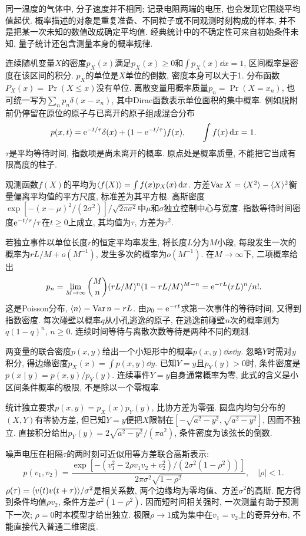 \label{ch:prob}
同一温度的气体中, 分子速度并不相同; 记录电阻两端的电压, 也会发现它围绕平均值起伏. 概率描述的对象是重复准备、不同粒子或不同观测时刻构成的样本, 并不是把某一次未知的数值改成确定平均值. 经典统计中的不确定性可来自初始条件未知, 量子统计还包含测量本身的概率规律.

连续随机变量$X$的密度$p_X(x)$满足$p_X(x)\ge0$和$\int p_X(x)\dd x=1$, 区间概率是密度在该区间的积分. $p_X$的单位是$X$单位的倒数, 密度本身可以大于1. 分布函数$P_X(x)=\Pr(X\le x)$没有单位. 离散变量用概率质量$p_n=\Pr(X=x_n)$, 也可统一写为$\sum_n p_n\delta(x-x_n)$, 其中Dirac函数表示单位面积的集中概率. 例如脱附前仍停留在原位的原子与已离开的原子组成混合分布
\[
p(x,t)=\mathrm e^{-t/\tau}\delta(x)+(1-\mathrm e^{-t/\tau})f(x),\qquad \int f(x)\,\mathrm d x=1.
\]
$\tau$是平均等待时间, 指数项是尚未离开的概率. 原点处是概率质量, 不能把它当成有限高度的柱子.

观测函数$f(X)$的平均为$\langle f(X)\rangle=\int f(x)p_X(x)\,\mathrm d x$. 方差$\operatorname{Var} X=\langle X^2\rangle-\langle X\rangle^2$衡量偏离平均值的平方尺度, 标准差为其平方根. 高斯密度$\exp[-(x-\mu)^2/(2\sigma^2)]/\sqrt{2\pi\sigma^2}$中$\mu$和$\sigma$独立控制中心与宽度. 指数等待时间密度$\mathrm e^{-t/\tau}/\tau$在$t\ge0$上成立, 其均值为$\tau$, 方差为$\tau^2$.

若独立事件以单位长度$r$的恒定平均率发生, 将长度$L$分为$M$小段, 每段发生一次的概率为$rL/M+o(M^{-1})$, 发生多次的概率为$o(M^{-1})$. 在$M\to\infty$下, 二项概率给出
\[
 p_n=\lim_{M\to\infty}\binom Mn(rL/M)^n(1-rL/M)^{M-n}
 =\mathrm e^{-rL}(rL)^n/n!.
\]
这是Poisson分布, $\langle n\rangle=\operatorname{Var} n=rL$. 由$p_0=\mathrm e^{-rt}$求第一次事件的等待时间, 又得到指数密度. 每次碰壁以概率$q$从小孔逃逸的原子, 在逃逸前碰壁$n$次的概率则为$q(1-q)^n$, $n\ge0$. 连续时间等待与离散次数等待是两种不同的观测.

两变量的联合密度$p(x,y)$给出一个小矩形中的概率$p(x,y)\dd x\dd y$. 忽略$Y$时需对$y$积分, 得边缘密度$p_X(x)=\int p(x,y)\dd y$. 已知$Y=y$且$p_Y(y)>0$时, 条件密度是$p(x\mid y)=p(x,y)/p_Y(y)$. 连续事件$Y=y$自身通常概率为零, 此式的含义是小区间条件概率的极限, 不是除以一个零概率.

统计独立要求$p(x,y)=p_X(x)p_Y(y)$, 比协方差为零强. 圆盘内均匀分布的$(X,Y)$有零协方差, 但已知$Y=y$便把$X$限制在$[-\sqrt{a^2-y^2},\sqrt{a^2-y^2}]$, 因而不独立. 直接积分给出$p_Y(y)=2\sqrt{a^2-y^2}/(\pi a^2)$, 条件密度为该弦长的倒数.

噪声电压在相隔$\tau$的两时刻可近似用等方差联合高斯表示:
\[
p(v_1,v_2)=\frac{\exp[-(v_1^2-2\rho v_1v_2+v_2^2)/(2\sigma^2(1-\rho^2))]}{2\pi\sigma^2\sqrt{1-\rho^2}},\quad |\rho|<1.
\]
$\rho(\tau)=\langle v(t)v(t+\tau)\rangle/\sigma^2$是相关系数, 两个边缘均为零均值、方差$\sigma^2$的高斯. 配方得到条件均值$\rho v_2$, 条件方差$\sigma^2(1-\rho^2)$. 因而短时间相关强时, 一次测量有助于预测下一次; $\rho=0$时本模型才给出独立. 极限$\rho\to1$成为集中在$v_1=v_2$上的奇异分布, 不能直接代入普通二维密度.

